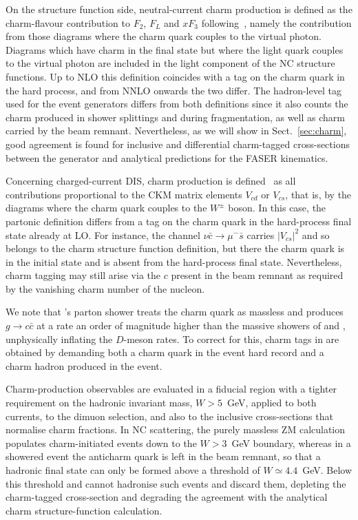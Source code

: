 On the structure function side, neutral-current charm production is defined as the charm-flavour contribution to $F_2$, $F_L$ and $xF_3$ following~\cite{Forte:2010ta}, namely the contribution from those diagrams where the charm quark couples to the virtual photon.
%
Diagrams which have charm in the final state but where the light quark couples to the virtual photon are included in the light component of the NC structure functions. 
%
Up to NLO this definition coincides with a tag on the charm quark in the hard process, and from NNLO onwards the two differ.
%
The hadron-level tag used for the event generators differs from both definitions since it also counts the charm produced in shower splittings and during fragmentation, as well as charm carried by the beam remnant. 
%
Nevertheless, as we will show in Sect.~\ref{sec:charm}, good agreement is found for inclusive and differential charm-tagged cross-sections between the generator and analytical predictions for the FASER kinematics. 

Concerning charged-current DIS, charm production is defined~\cite{Ball:2011mu} as all contributions proportional to the CKM matrix elements $V_{cd}$ or $V_{cs}$, that is, by the diagrams where the charm quark couples to the $W^\pm$ boson.
%
In this case, the partonic definition differs from a tag on the charm quark in the hard-process final state already at LO. 
%
For instance, the channel $\nu \bar{c} \to \mu^- \bar{s}$ carries $|V_{cs}|^2$ and so belongs to the charm structure function definition, but there the charm quark is in the initial state and is absent from the hard-process final state. 
%
Nevertheless, charm tagging may still arise via the $c$ present in the beam remnant as required by the vanishing charm number of the nucleon. 

We note that \sherpa's parton shower treats the charm quark as massless and produces $g \to c\bar c$ at
a rate an order of magnitude higher than the massive showers of \pythia and
\herwig, unphysically inflating the $D$-meson rates.
%
To correct for this, charm tags in \sherpa are obtained by demanding both a charm quark in the event hard record and a charm hadron produced in
the event.

Charm-production observables are evaluated in a fiducial region with a tighter requirement on the hadronic invariant mass, $W > 5$~GeV, applied to both currents, to the dimuon selection, and also to the inclusive cross-sections that normalise charm fractions.
%
In NC scattering, the purely massless ZM calculation populates charm-initiated events down to the $W > 3$~GeV boundary, whereas in a showered event the anticharm quark is left in the beam remnant, so that a hadronic final state can only be formed above a threshold of $W \simeq 4.4$~GeV.
%
Below this threshold \pythia and \herwig cannot hadronise such events and discard them, depleting the charm-tagged cross-section and degrading the agreement with the analytical charm structure-function calculation.

